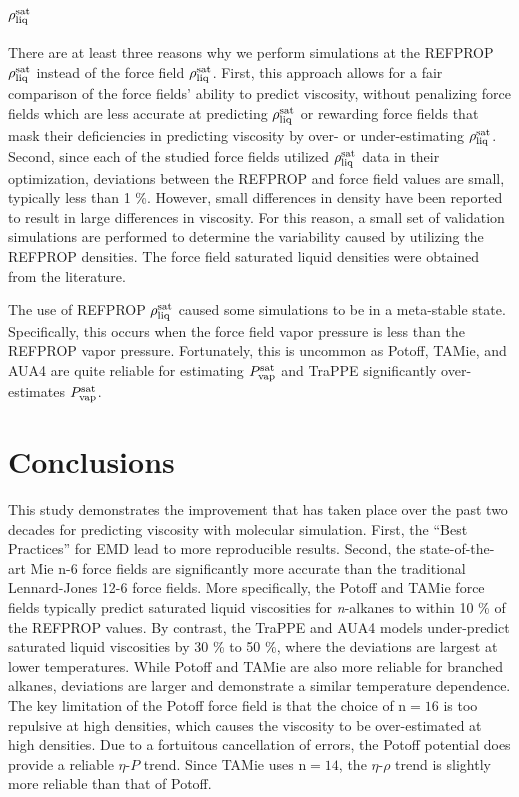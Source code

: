 \documentclass[preprint,review,12pt]{elsarticle}
\begin{document}
	\subsection{$\rho_{\rm liq}^{\rm sat}$}
	
	There are at least three reasons why we perform simulations at the REFPROP $\rho_{\rm liq}^{\rm sat}$ instead of the force field $\rho_{\rm liq}^{\rm sat}$. First, this approach allows for a fair comparison of the force fields' ability to predict viscosity, without penalizing force fields which are less accurate at predicting $\rho_{\rm liq}^{\rm sat}$ or rewarding force fields that mask their deficiencies in predicting viscosity by over- or under-estimating $\rho_{\rm liq}^{\rm sat}$. Second, since each of the studied force fields utilized $\rho_{\rm liq}^{\rm sat}$ data in their optimization, deviations between the REFPROP and force field values are small, typically less than 1 \%. However, small differences in density have been reported to result in large differences in viscosity. For this reason, a small set of validation simulations are performed to determine the variability caused by utilizing the REFPROP densities. The force field saturated liquid densities were obtained from the literature.      
	
	The use of REFPROP $\rho_{\rm liq}^{\rm sat}$ caused some simulations to be in a meta-stable state. Specifically, this occurs when the force field vapor pressure is less than the REFPROP vapor pressure. Fortunately, this is uncommon as Potoff, TAMie, and AUA4 are quite reliable for estimating $P_{\rm vap}^{\rm sat}$ and TraPPE significantly over-estimates $P_{\rm vap}^{\rm sat}$.
	
	\section{Conclusions} \label{Conclusions}
	
	This study demonstrates the improvement that has taken place over the past two decades for predicting viscosity with molecular simulation. First, the ``Best Practices'' for EMD lead to more reproducible results. Second, the state-of-the-art Mie n-6 force fields are significantly more accurate than the traditional Lennard-Jones 12-6 force fields. More specifically, the Potoff and TAMie force fields typically predict saturated liquid viscosities for \textit{n}-alkanes to within 10 \% of the REFPROP values. By contrast, the TraPPE and AUA4 models under-predict saturated liquid viscosities by 30 \% to 50 \%, where the deviations are largest at lower temperatures. While Potoff and TAMie are also more reliable for branched alkanes, deviations are larger and demonstrate a similar temperature dependence. The key limitation of the Potoff force field is that the choice of n$=16$ is too repulsive at high densities, which causes the viscosity to be over-estimated at high densities. Due to a fortuitous cancellation of errors, the Potoff potential does provide a reliable $\eta$-$P$ trend. Since TAMie uses n$=14$, the $\eta$-$\rho$ trend is slightly more reliable than that of Potoff.
	
\end{document}

